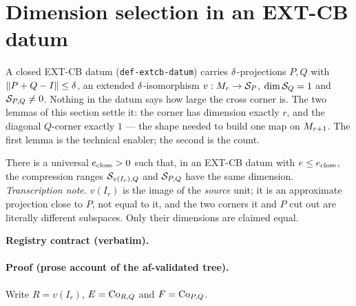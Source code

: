 \section{Dimension selection in an EXT-CB datum}\label{sec:extcb1-dimension-selection}

A closed EXT-CB datum (\texttt{def-extcb-datum}) carries $\delta$-projections $P,Q$ with
$\lVert P+Q-I\rVert\le\delta$, an extended $\delta$-isomorphism $v:M_{r}\to\mathcal S_{P}$,
$\dim\mathcal S_{Q}=1$ and $\mathcal S_{P,Q}\ne0$. Nothing in the datum says how large the cross
corner is. The two lemmas of this section settle it: the corner has dimension exactly
$r$, and the diagonal $Q$-corner exactly $1$ --- the shape needed to build one map on
$M_{r+1}$. The first lemma is the technical enabler; the second is the count.

\begin{lemma}\label{lem:extcb1-close-corner-dimension}
There is a universal $e_{\mathrm{close}}>0$ such that, in an EXT-CB datum with
$e\le e_{\mathrm{close}}$, the compression ranges $\mathcal S_{v(I_r),Q}$ and
$\mathcal S_{P,Q}$ have the same dimension.
\emph{Transcription note.} $v(I_r)$ is the image of the \emph{source} unit; it is an
approximate projection close to $P$, not equal to it, and the two corners it and $P$ cut
out are literally different subspaces. Only their dimensions are claimed equal.
\end{lemma}

\noindent\textbf{Registry contract (verbatim).}

\paragraph{Proof (prose account of the af-validated tree).}
Write $R=v(I_r)$, $E=\mathrm{Co}_{R,Q}$ and $F=\mathrm{Co}_{P,Q}$.

